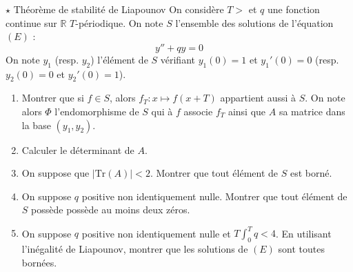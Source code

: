 \documentclass[french,a4paper]{article}
\newcommand{\R}{\mathbb{R}}
\newcommand{\Tr}{\text{Tr}}
\theoremstyle{plain}
\theoremstyle{definition}
\theoremstyle{remark}
\begin{document}
\begin{ex}[X]{$\star$ Théorème de stabilité de Liapounov}
	On considère $T>$ et $q$ une fonction continue sur $\R$ $T$-périodique. On note $S$ l'ensemble des solutions de l'équation $(E)$ : $$y''+qy=0$$ On note $y_1$ (resp. $y_2$) l'élément de $S$ vérifiant $y_1(0)=1$ et $y_1'(0)=0$ (resp. $y_2(0)=0$ et $y_2'(0)=1$).
	\begin{enumerate}
		\item Montrer que si $f\in S$, alors $f_T:x\mapsto f(x+T)$ appartient aussi à $S$. On note alors $\Phi$ l'endomorphisme de $S$ qui à $f$ associe $f_T$ ainsi que $A$ sa matrice dans la base $(y_1,y_2)$.
		\item Calculer le déterminant de $A$.
		\item On suppose que $\lvert\Tr(A)\rvert<2$. Montrer que tout élément de $S$ est borné.
		\item On suppose $q$ positive non identiquement nulle. Montrer que tout élément de $S$ possède possède au moins deux zéros.
		\item On suppose $q$ positive non identiquement nulle et $T\displaystyle\int_{0}^{T}q<4$. En utilisant l'inégalité de Liapounov, montrer que les solutions de $(E)$ sont toutes bornées.
	\end{enumerate}
\end{ex}
\end{document}
